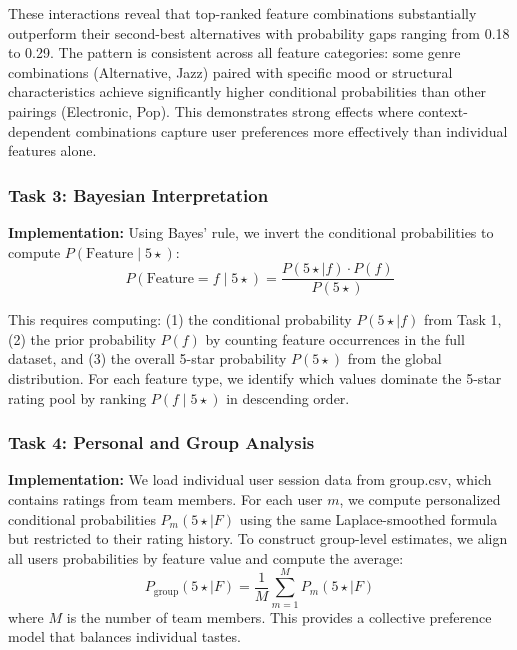 \documentclass[12pt,a4paper]{article}
\begin{document}
These interactions reveal that top-ranked feature combinations substantially outperform their second-best alternatives with probability gaps ranging from 0.18 to 0.29. The pattern is consistent across all feature categories: some genre combinations (Alternative, Jazz) paired with specific mood or structural characteristics achieve significantly higher conditional probabilities than other pairings (Electronic, Pop). This demonstrates strong effects where context-dependent combinations capture user preferences more effectively than individual features alone.

\subsubsection{Task 3: Bayesian Interpretation}

\textbf{Implementation:} Using Bayes' rule, we invert the conditional probabilities to compute $P(\text{Feature} \mid 5\star)$:
\begin{equation}
P(\text{Feature} = f \mid 5\star) = \frac{P(5\star \mid f) \cdot P(f)}{P(5\star)}
\end{equation}

This requires computing: (1) the conditional probability $P(5\star \mid f)$ from Task 1, (2) the prior probability $P(f)$ by counting feature occurrences in the full dataset, and (3) the overall 5-star probability $P(5\star)$ from the global distribution. For each feature type, we identify which values dominate the 5-star rating pool by ranking $P(f \mid 5\star)$ in descending order.

\subsubsection{Task 4: Personal and Group Analysis}

\textbf{Implementation:} We load individual user session data from group.csv, which contains ratings from team members. For each user $m$, we compute personalized conditional probabilities $P_m(5\star \mid F)$ using the same Laplace-smoothed formula but restricted to their rating history. To construct group-level estimates, we align all users probabilities by feature value and compute the average:
\begin{equation}
P_{\text{group}}(5\star \mid F) = \frac{1}{M} \sum_{m=1}^{M} P_m(5\star \mid F)
\end{equation}
where $M$ is the number of team members. This provides a collective preference model that balances individual tastes.
\end{document}
